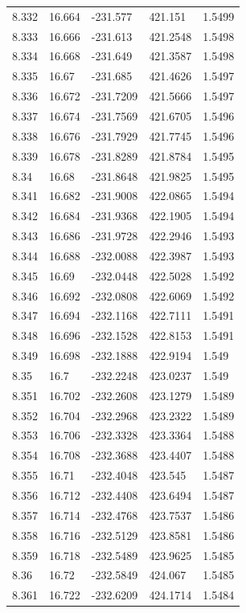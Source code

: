 \begin{tabular}{lllll}
8.332 & 16.664 & -231.577 & 421.151 & 1.5499 \\
8.333 & 16.666 & -231.613 & 421.2548 & 1.5498 \\
8.334 & 16.668 & -231.649 & 421.3587 & 1.5498 \\
8.335 & 16.67 & -231.685 & 421.4626 & 1.5497 \\
8.336 & 16.672 & -231.7209 & 421.5666 & 1.5497 \\
8.337 & 16.674 & -231.7569 & 421.6705 & 1.5496 \\
8.338 & 16.676 & -231.7929 & 421.7745 & 1.5496 \\
8.339 & 16.678 & -231.8289 & 421.8784 & 1.5495 \\
8.34 & 16.68 & -231.8648 & 421.9825 & 1.5495 \\
8.341 & 16.682 & -231.9008 & 422.0865 & 1.5494 \\
8.342 & 16.684 & -231.9368 & 422.1905 & 1.5494 \\
8.343 & 16.686 & -231.9728 & 422.2946 & 1.5493 \\
8.344 & 16.688 & -232.0088 & 422.3987 & 1.5493 \\
8.345 & 16.69 & -232.0448 & 422.5028 & 1.5492 \\
8.346 & 16.692 & -232.0808 & 422.6069 & 1.5492 \\
8.347 & 16.694 & -232.1168 & 422.7111 & 1.5491 \\
8.348 & 16.696 & -232.1528 & 422.8153 & 1.5491 \\
8.349 & 16.698 & -232.1888 & 422.9194 & 1.549 \\
8.35 & 16.7 & -232.2248 & 423.0237 & 1.549 \\
8.351 & 16.702 & -232.2608 & 423.1279 & 1.5489 \\
8.352 & 16.704 & -232.2968 & 423.2322 & 1.5489 \\
8.353 & 16.706 & -232.3328 & 423.3364 & 1.5488 \\
8.354 & 16.708 & -232.3688 & 423.4407 & 1.5488 \\
8.355 & 16.71 & -232.4048 & 423.545 & 1.5487 \\
8.356 & 16.712 & -232.4408 & 423.6494 & 1.5487 \\
8.357 & 16.714 & -232.4768 & 423.7537 & 1.5486 \\
8.358 & 16.716 & -232.5129 & 423.8581 & 1.5486 \\
8.359 & 16.718 & -232.5489 & 423.9625 & 1.5485 \\
8.36 & 16.72 & -232.5849 & 424.067 & 1.5485 \\
8.361 & 16.722 & -232.6209 & 424.1714 & 1.5484 \\

\end{tabular}
